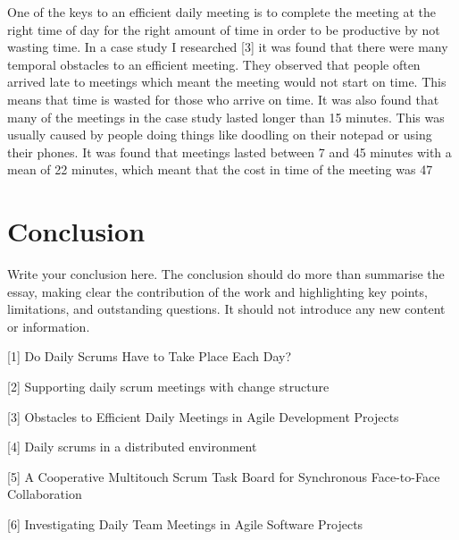 \documentclass{scrartcl}
\begin{document}
One of the keys to an efficient daily meeting is to complete the meeting at the right time of day for the right amount of time in order to be productive by not wasting time. In a case study I researched [3] it was found that there were many temporal obstacles to an efficient meeting. They observed that people often arrived late to meetings which meant the meeting would not start on time. This means that time is wasted for those who arrive on time. It was also found that many of the meetings in the case study lasted longer than 15 minutes. This was usually caused by people doing things like doodling on their notepad or using their phones. It was found that meetings lasted between 7 and 45 minutes with a mean of 22 minutes, which meant that the cost in time of the meeting was 47%

\section{Conclusion}

Write your conclusion here. The conclusion should do more than summarise the essay, making clear the contribution of the work and highlighting key points, limitations, and outstanding questions. It should not introduce any new content or information.




[1] Do Daily Scrums Have to Take Place Each Day?

[2] Supporting daily scrum meetings with change structure

[3] Obstacles to Efficient Daily Meetings in Agile Development Projects

[4] Daily scrums in a distributed environment

[5] A Cooperative Multitouch Scrum Task Board for Synchronous Face-to-Face Collaboration

[6] Investigating Daily Team Meetings in Agile Software Projects
\end{document}
